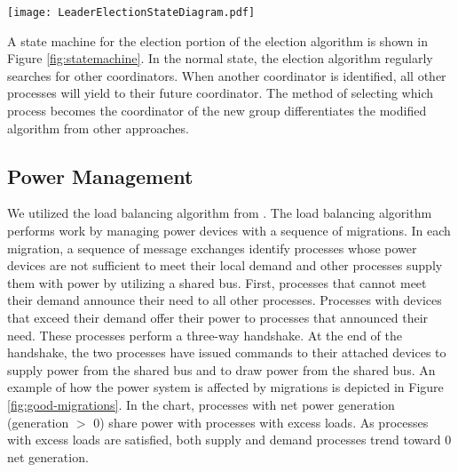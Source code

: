 \begin{figure*}[!t]
\texttt{[image: LeaderElectionStateDiagram.pdf]}
\caption[State machine for an election.]{State machine for an election. Processes start as coordinators in the ``Normal'' state and search for other coordinators to join with. Processes immediately respond to \ac{AYC} messages they receive. The algorithm was modified by adding a ``Ready Acknowledgment'' message as the final step of completing the election. Additionally, processes only accept invites if they have received an ``\ac{AYC} Response'' message from the inviting process.}
\label{fig:statemachine}
\end{figure*}

A state machine for the election portion of the election algorithm is shown in Figure \ref{fig:statemachine}.
In the normal state, the election algorithm regularly searches for other coordinators.
When another coordinator is identified, all other processes will yield to their future coordinator.
The method of selecting which process becomes the coordinator of the new group differentiates the modified algorithm from other approaches.

\subsection{Power Management}

We utilized the load balancing algorithm from \cite{LOADBALANCING}.
The load balancing algorithm performs work by managing power devices with a sequence of migrations\cite{HILTESTBED}.
In each migration, a sequence of message exchanges identify processes whose power devices are not sufficient to meet their local demand and other processes supply them with power by utilizing a shared bus.
First, processes that cannot meet their demand announce their need to all other processes.
Processes with devices that exceed their demand offer their power to processes that announced their need.
These processes perform a three-way handshake.
At the end of the handshake, the two processes have issued commands to their attached devices to supply power from the shared bus and to draw power from the shared bus.
An example of how the power system is affected by migrations is depicted in Figure \ref{fig:good-migrations}.
In the chart, processes with net power generation (generation $>$ 0) share power with processes with excess loads.
As processes with excess loads are satisfied, both supply and demand processes trend toward 0 net generation.

